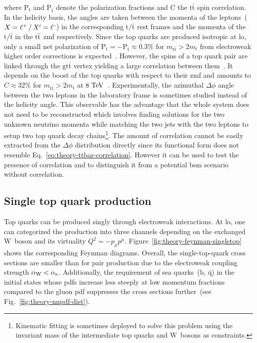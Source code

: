 where $\mathrm{P}_\mathrm{t}$ and $\mathrm{P}_{\bar{\mathrm{t}}}$ denote the polarization fractions and $\mathrm{C}$ the $\mathrm{t\bar{t}}$ spin correlation. In the helicity basis, the angles are taken between the momenta of the leptons~($X=\ell^{\rmplus}\,/\,X^\prime=\ell^{\rmminus}$) in the corresponding $\mathrm{t}/\bar{\mathrm{t}}$ rest frames and the momenta of the $\mathrm{t}/\bar{\mathrm{t}}$ in the $\mathrm{t}\bar{\mathrm{t}}$ \gls{zmf} respectively. Since the top quarks are produced isotropic at \gls{lo}, only a small net polarization of $\mathrm{P}_\mathrm{t}=-\mathrm{P}_{\bar{\mathrm{t}}}\approx0.3\%$ for $m_\mathrm{t\bar{t}}>2m_\mathrm{t}$ from electroweak higher order corrections is expected~\cite{Bernreuther:2010ny,Bernreuther:2013aga}. However, the spins of a top quark pair are linked through the $\mathrm{g\mathrm{t}\bar{\mathrm{t}}}$ vertex yielding a large correlation between them~\cite{Mahlon:2010gw}. It depends on the boost of the top quarks with respect to their \gls{zmf} and amounts to $C\approx32\%$ for $m_\mathrm{t\bar{t}}>2m_\mathrm{t}$ at $8~\mathrm{TeV}$~\cite{Bernreuther:2013aga}. Experimentally, the azimuthal $\Delta\phi$ angle between the two leptons in the laboratory frame is sometimes studied instead of the helicity angle. This observable has the advantage that the whole \ttbar system does not need to be reconstructed which involves finding solutions for the two unknown neutrino momenta while matching the two jets with the two leptons to setup two top quark decay chains\footnote{Kinematic fitting is sometimes deployed to solve this problem using the invariant mass of the intermediate top quarks and $\mathrm{W}$~bosons as constraints.}. The amount of correlation cannot be easily extracted from the $\Delta\phi$ distribution directly since its functional form does not resemble Eq.~\ref{eq:theory-ttbar-correlation}. However it can be used to test the presence of \ttbar correlation and to distinguish it from a potential \gls{bsm} scenario without correlation.


\subsection{Single top quark production}

Top quarks can be produced singly through electroweak interactions. At \gls{lo}, one can categorized the production into three channels depending on the exchanged $\mathrm{W}$~boson and its virtuality $Q^{2}=-p_{\mu}p^{\mu}$. Figure~\ref{fig:theory-feynman-singletop} shows the corresponding Feynman diagrams. Overall, the single-top-quark cross sections are smaller than for pair production due to the electroweak coupling strength ${\alpha_\mathrm{W}}<{\alpha_\mathrm{s}}$. Additionally, the requirement of sea quarks~($\mathrm{b}$, $\bar{\mathrm{q}}$) in the initial states whose \glspl{pdf} increase less steeply at low momentum fractions compared to the gluon \gls{pdf} suppresses the cross sections further~(see Fig.~\ref{fig:theory-nnpdf-dist}).

